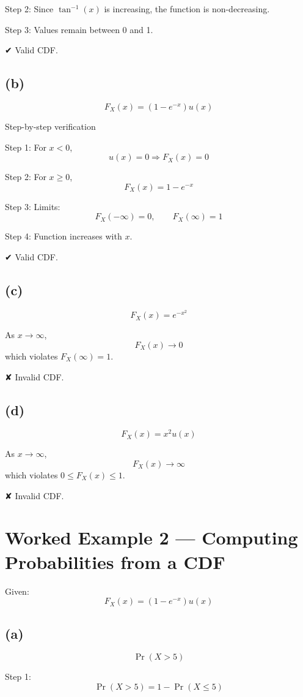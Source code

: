 \documentclass[12pt]{article}
\begin{document}
Step 2: Since $\tan^{-1}(x)$ is increasing, the function is non-decreasing.

Step 3: Values remain between 0 and 1.

✔ Valid CDF.

\subsection*{(b)}

\[
F_X(x) = (1 - e^{-x})u(x)
\]

Step-by-step verification

Step 1: For $x < 0$,
\[
u(x) = 0 \Rightarrow F_X(x) = 0
\]

Step 2: For $x \ge 0$,
\[
F_X(x) = 1 - e^{-x}
\]

Step 3: Limits:
\[
F_X(-\infty) = 0, \qquad F_X(\infty) = 1
\]

Step 4: Function increases with $x$.

✔ Valid CDF.

\subsection*{(c)}

\[
F_X(x) = e^{-x^2}
\]

As $x \to \infty$,
\[
F_X(x) \to 0
\]
which violates $F_X(\infty) = 1$.

✘ Invalid CDF.

\subsection*{(d)}

\[
F_X(x) = x^2 u(x)
\]

As $x \to \infty$,
\[
F_X(x) \to \infty
\]
which violates $0 \le F_X(x) \le 1$.

✘ Invalid CDF.

\section{Worked Example 2 --- Computing Probabilities from a CDF}

Given:
\[
F_X(x) = (1 - e^{-x})u(x)
\]

\subsection*{(a)}

\[
\Pr(X > 5)
\]

Step 1:
\[
\Pr(X > 5) = 1 - \Pr(X \le 5)
\]
\end{document}
